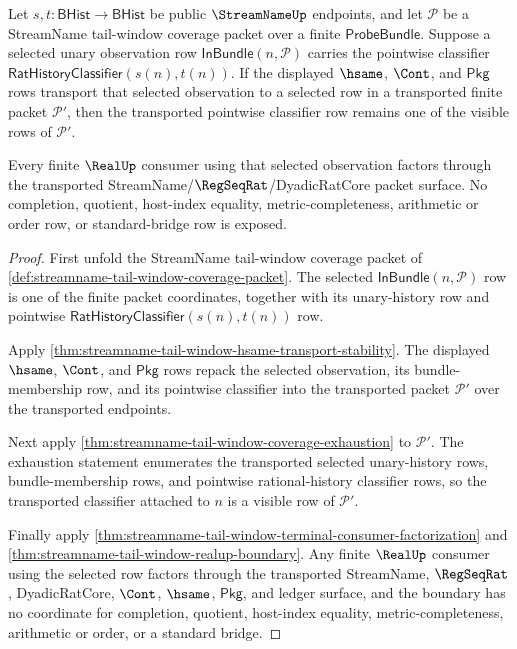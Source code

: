 \begin{theorem}
\label{thm:streamname-tail-window-selected-pointwise-transport}
Let $s,t:\mathsf{BHist}\to\mathsf{BHist}$ be public $\StreamNameUp$
endpoints, and let $\mathcal P$ be a StreamName tail-window coverage packet
over a finite $\mathsf{ProbeBundle}$. Suppose a selected unary observation row
$\mathsf{InBundle}(n,\mathcal P)$ carries the pointwise classifier
$\mathsf{RatHistoryClassifier}(s(n),t(n))$. If the displayed $\hsame$,
$\Cont$, and $\mathsf{Pkg}$ rows transport that selected observation to a
selected row in a transported finite packet $\mathcal P'$, then the
transported pointwise classifier row remains one of the visible rows of
$\mathcal P'$.

Every finite $\RealUp$ consumer using that selected observation factors
through the transported StreamName/$\RegSeqRat$/DyadicRatCore packet surface.
No completion, quotient, host-index equality, metric-completeness,
arithmetic or order row, or standard-bridge row is exposed.
\end{theorem}
\begin{proof}
First unfold the StreamName tail-window coverage packet of
\autoref{def:streamname-tail-window-coverage-packet}. The selected
$\mathsf{InBundle}(n,\mathcal P)$ row is one of the finite packet coordinates,
together with its unary-history row and pointwise
$\mathsf{RatHistoryClassifier}(s(n),t(n))$ row.

Apply \autoref{thm:streamname-tail-window-hsame-transport-stability}. The
displayed $\hsame$, $\Cont$, and $\mathsf{Pkg}$ rows repack the selected
observation, its bundle-membership row, and its pointwise classifier into the
transported packet $\mathcal P'$ over the transported endpoints.

Next apply \autoref{thm:streamname-tail-window-coverage-exhaustion} to
$\mathcal P'$. The exhaustion statement enumerates the transported selected
unary-history rows, bundle-membership rows, and pointwise rational-history
classifier rows, so the transported classifier attached to $n$ is a visible
row of $\mathcal P'$.

Finally apply
\autoref{thm:streamname-tail-window-terminal-consumer-factorization} and
\autoref{thm:streamname-tail-window-realup-boundary}. Any finite $\RealUp$
consumer using the selected row factors through the transported StreamName,
$\RegSeqRat$, DyadicRatCore, $\Cont$, $\hsame$, $\mathsf{Pkg}$, and ledger
surface, and the boundary has no coordinate for completion, quotient,
host-index equality, metric-completeness, arithmetic or order, or a standard
bridge.
\end{proof}

